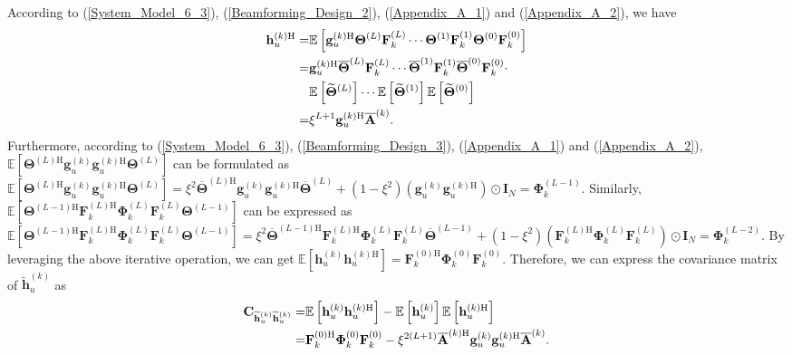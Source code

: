 \documentclass[lettersize,journal]{IEEEtran}
\theoremstyle{remark}
\begin{document}
According to (\ref{System_Model_6_3}), (\ref{Beamforming_Design_2}), (\ref{Appendix_A_1}) and (\ref{Appendix_A_2}), we have
\begin{align}\label{Appendix_A_3}
    \notag\mathbf{h}_u^{(k)\mathrm{H}}
    =&\mathbb{E}\left[\mathbf{g}_u^{(k)\mathrm{H}}\mathbf{\Theta}^{(L)}\mathbf{F}_k^{(L)}\cdots
    \mathbf{\Theta}^{(1)}\mathbf{F}_k^{(1)}\mathbf{\Theta}^{(0)}\mathbf{F}_k^{(0)}\right]\\
    \notag=&\mathbf{g}_u^{(k)\mathrm{H}}
    \overline{\mathbf{\Theta}}^{(L)}\mathbf{F}_k^{(L)}
    \cdots\overline{\mathbf{\Theta}}^{(1)}\mathbf{F}_k^{(1)}
    \overline{\mathbf{\Theta}}^{(0)}\mathbf{F}_k^{(0)}\cdot\\
    \notag&\mathbb{E}\left[\widetilde{\mathbf{\Theta}}^{(L)}\right]\cdots
    \mathbb{E}\left[\widetilde{\mathbf{\Theta}}^{(1)}\right]
    \mathbb{E}\left[\widetilde{\mathbf{\Theta}}^{(0)}\right]\\
    =&\xi^{L+1}\mathbf{g}_u^{(k)\mathrm{H}}\overline{\mathbf{A}}^{(k)}.
\end{align}
Furthermore, according to (\ref{System_Model_6_3}), (\ref{Beamforming_Design_3}), (\ref{Appendix_A_1}) and (\ref{Appendix_A_2}), $\mathbb{E}[\mathbf{\Theta}^{(L)\mathrm{H}}\mathbf{g}_u^{(k)}\mathbf{g}_u^{(k)\mathrm{H}}
\mathbf{\Theta}^{(L)}]$ can be formulated as $\mathbb{E}[\mathbf{\Theta}^{(L)\mathrm{H}}
\mathbf{g}_u^{(k)}\mathbf{g}_u^{(k)\mathrm{H}}\mathbf{\Theta}^{(L)}]
=\xi^2\overline{\mathbf{\Theta}}^{(L)\mathrm{H}}\mathbf{g}_u^{(k)}\mathbf{g}_u^{(k)\mathrm{H}}
\overline{\mathbf{\Theta}}^{(L)}+(1-\xi^2)(\mathbf{g}_u^{(k)}\mathbf{g}_u^{(k)\mathrm{H}})
\odot\mathbf{I}_N=\mathbf{\Phi}_k^{(L-1)}$. Similarly, $\mathbb{E}[\mathbf{\Theta}^{(L-1)\mathrm{H}}\mathbf{F}_k^{(L)\mathrm{H}}
\mathbf{\Phi}_k^{(L)}\mathbf{F}_k^{(L)}\mathbf{\Theta}^{(L-1)}]$ can be expressed as $\mathbb{E}[\mathbf{\Theta}^{(L-1)\mathrm{H}}\mathbf{F}_k^{(L)\mathrm{H}}
\mathbf{\Phi}_k^{(L)}\mathbf{F}_k^{(L)}\mathbf{\Theta}^{(L-1)}]
=\xi^2\overline{\mathbf{\Theta}}^{(L-1)\mathrm{H}}
\mathbf{F}_k^{(L)\mathrm{H}}\mathbf{\Phi}_k^{(L)}\mathbf{F}_k^{(L)}
\overline{\mathbf{\Theta}}^{(L-1)}+(1-\xi^2)(\mathbf{F}_k^{(L)\mathrm{H}}\mathbf{\Phi}_k^{(L)}
\mathbf{F}_k^{(L)})\odot\mathbf{I}_N
=\mathbf{\Phi}_k^{(L-2)}$. By leveraging the above iterative operation, we can get $\mathbb{E}[\mathbf{h}_u^{(k)}\mathbf{h}_u^{(k)\mathrm{H}}]
=\mathbf{F}_k^{(0)\mathrm{H}}\mathbf{\Phi}_k^{(0)}\mathbf{F}_k^{(0)}$. Therefore, we can express the covariance matrix of $\widetilde{\mathbf{h}}_u^{(k)}$ as
\begin{align}\label{Appendix_A_7}
    \notag\mathbf{C}_{\widetilde{\mathbf{h}}_u^{(k)}\widetilde{\mathbf{h}}_u^{(k)}}
    =&\mathbb{E}\left[\mathbf{h}_u^{(k)}\mathbf{h}_u^{(k)\mathrm{H}}\right]-
    \mathbb{E}\left[\mathbf{h}_u^{(k)}\right]\mathbb{E}\left[\mathbf{h}_u^{(k)\mathrm{H}}\right]\\
    =&\mathbf{F}_k^{(0)\mathrm{H}}\mathbf{\Phi}_k^{(0)}\mathbf{F}_k^{(0)}
    -\xi^{2(L+1)}\overline{\mathbf{A}}^{(k)\mathrm{H}}\mathbf{g}_u^{(k)}
    \mathbf{g}_u^{(k)\mathrm{H}}\overline{\mathbf{A}}^{(k)}.
\end{align}
\end{document}
